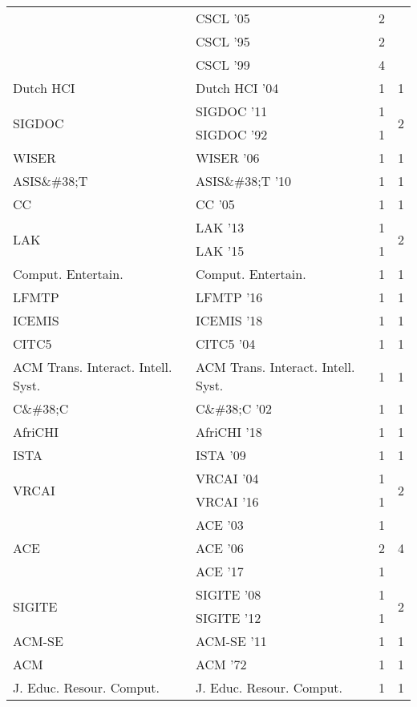 \begin{table*}[t]
\begin{tabular}{llrr}
& CSCL '05 & 2 &\\
& CSCL '95 & 2 &\\
& CSCL '99 & 4 &\\
\multirow{1}{*}{Dutch HCI } & Dutch HCI '04 & 1 & \multirow{1}{*}{1}\\
\multirow{2}{*}{SIGDOC } & SIGDOC '11 & 1 & \multirow{2}{*}{2}\\
& SIGDOC '92 & 1 &\\
\multirow{1}{*}{WISER } & WISER '06 & 1 & \multirow{1}{*}{1}\\
\multirow{1}{*}{ASIS\&\#38;T } & ASIS\&\#38;T '10 & 1 & \multirow{1}{*}{1}\\
\multirow{1}{*}{CC } & CC '05 & 1 & \multirow{1}{*}{1}\\
\multirow{2}{*}{LAK } & LAK '13 & 1 & \multirow{2}{*}{2}\\
& LAK '15 & 1 &\\
\multirow{1}{*}{Comput. Entertain.} & Comput. Entertain. & 1 & \multirow{1}{*}{1}\\
\multirow{1}{*}{LFMTP } & LFMTP '16 & 1 & \multirow{1}{*}{1}\\
\multirow{1}{*}{ICEMIS } & ICEMIS '18 & 1 & \multirow{1}{*}{1}\\
\multirow{1}{*}{CITC5 } & CITC5 '04 & 1 & \multirow{1}{*}{1}\\
\multirow{1}{*}{ACM Trans. Interact. Intell. Syst.} & ACM Trans. Interact. Intell. Syst. & 1 & \multirow{1}{*}{1}\\
\multirow{1}{*}{C\&\#38;C } & C\&\#38;C '02 & 1 & \multirow{1}{*}{1}\\
\multirow{1}{*}{AfriCHI } & AfriCHI '18 & 1 & \multirow{1}{*}{1}\\
\multirow{1}{*}{ISTA } & ISTA '09 & 1 & \multirow{1}{*}{1}\\
\multirow{2}{*}{VRCAI } & VRCAI '04 & 1 & \multirow{2}{*}{2}\\
& VRCAI '16 & 1 &\\
\multirow{3}{*}{ACE } & ACE '03 & 1 & \multirow{3}{*}{4}\\
& ACE '06 & 2 &\\
& ACE '17 & 1 &\\
\multirow{2}{*}{SIGITE } & SIGITE '08 & 1 & \multirow{2}{*}{2}\\
& SIGITE '12 & 1 &\\
\multirow{1}{*}{ACM-SE } & ACM-SE '11 & 1 & \multirow{1}{*}{1}\\
\multirow{1}{*}{ACM } & ACM '72 & 1 & \multirow{1}{*}{1}\\
\multirow{1}{*}{J. Educ. Resour. Comput.} & J. Educ. Resour. Comput. & 1 & \multirow{1}{*}{1}\\

\end{tabular}
\end{table*}
